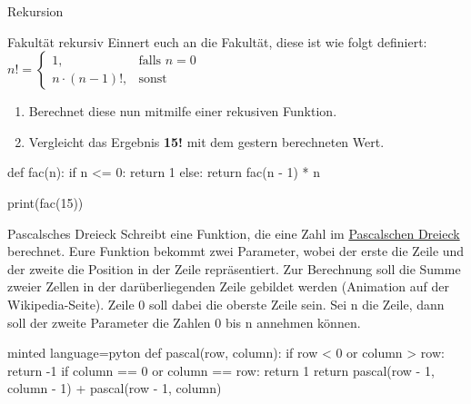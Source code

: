 \begin{task}[points=auto]{Rekursion}
    \begin{subtask*}[points=0]{Fakultät rekursiv }
        Einnert euch an die Fakultät, diese ist wie folgt definiert:
        $n! =\left\{\begin{array}{cl} 1, & \mbox{falls }  n = 0 \\ n \cdot(n-1)!, & \mbox{sonst} \end{array}\right.$
        \begin{enumerate}
            \item Berechnet diese nun mitmilfe einer rekusiven Funktion.
            \item Vergleicht das Ergebnis \textbf{15!} mit dem gestern berechneten Wert.
        \end{enumerate}

        \begin{solution}
            \begin{codeBlock}
                def fac(n):
                    if n <= 0:
                        return 1
                    else:
                        return fac(n - 1) * n


                print(fac(15))
            \end{codeBlock}
        \end{solution}
    \end{subtask*}
    \begin{subtask*}[points=0]{Pascalsches Dreieck }
        Schreibt eine Funktion, die eine Zahl im \href{https://de.wikipedia.org/wiki/Pascalsches_Dreieck}{Pascalschen Dreieck}
        berechnet. Eure Funktion bekommt zwei Parameter, wobei der erste die Zeile und
        der zweite die Position in der Zeile repräsentiert. Zur Berechnung soll die
        Summe zweier Zellen in der darüberliegenden Zeile gebildet werden (Animation
        auf der Wikipedia-Seite). Zeile 0 soll dabei die oberste Zeile sein. Sei n die
        Zeile, dann soll der zweite Parameter die Zahlen 0 bis n annehmen können.

        \begin{solution}
            \begin{codeBlock}[]{minted language=pyton}
                def pascal(row, column):
                    if row < 0 or column > row:
                        return -1
                    if column == 0 or column == row:
                        return 1
                    return pascal(row - 1, column - 1) + pascal(row - 1, column)



\end{codeBlock}
\end{solution}
\end{subtask*}
\end{task}
